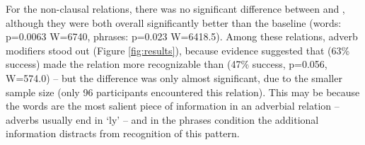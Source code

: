 For the non-clausal relations, there was no significant difference between  and , although they were both overall significantly better than the baseline (words: p=0.0063 W=6740, phrases: p=0.023 W=6418.5). Among these relations, adverb modifiers stood out (Figure \ref{fig:results}), because evidence suggested that  (63\% success) made the relation more recognizable than  (47\% success, p=0.056, W=574.0) -- but the difference was only almost significant, due to the smaller sample size (only 96 participants encountered this relation). This may be because the words are the most salient piece of information in an adverbial relation -- adverbs usually end in `ly' -- and in the phrases condition the additional information distracts from recognition of this pattern.

